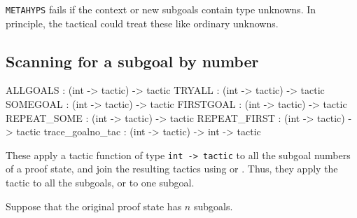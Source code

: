\begin{warn}
{\tt METAHYPS} fails if the context or new subgoals contain type unknowns.
In principle, the tactical could treat these like ordinary unknowns.
\end{warn}


\subsection{Scanning for a subgoal by number}
\begin{ttbox} 
ALLGOALS         : (int -> tactic) -> tactic
TRYALL           : (int -> tactic) -> tactic
SOMEGOAL         : (int -> tactic) -> tactic
FIRSTGOAL        : (int -> tactic) -> tactic
REPEAT_SOME      : (int -> tactic) -> tactic
REPEAT_FIRST     : (int -> tactic) -> tactic
trace_goalno_tac : (int -> tactic) -> int -> tactic
\end{ttbox}
These apply a tactic function of type {\tt int -> tactic} to all the
subgoal numbers of a proof state, and join the resulting tactics using
 or \@.  Thus, they apply the tactic to all the
subgoals, or to one subgoal.  

Suppose that the original proof state has $n$ subgoals.

